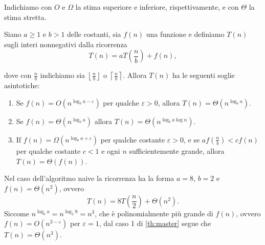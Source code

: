 Indichiamo con $ O $ e $ \Omega $ la stima superiore e inferiore, rispettivamente, e con $
\Theta $ la stima stretta.
\begin{theorem}
  \label{th:master}
  Siano $ a\ge 1 $ e $ b>1 $ delle costanti, sia $ f(n) $ una funzione e definiamo $ T(n) $ sugli
  interi nonnegativi dalla ricorrenza
  \begin{equation*}
    T(n) = aT(\frac{n}{b}) + f(n),
  \end{equation*}
\end{theorem}
dove con $ \frac{n}{b} $ indichiamo sia $ \left\lfloor \frac{n}{b} \right\rfloor $ o $ \left\lceil
\frac{n}{b} \right\rceil  $. Allora $ T(n) $ ha le seguenti soglie asintotiche:
\begin{enumerate}
  \item Se $ f(n) = O(n^{\log_b a-\varepsilon}) $ per qualche $ \varepsilon >0 $, allora $ T(n) =
    \Theta(n^{\log_b a}) $.
  \item Se $ f(n) = \Theta(n^{\log_b a}) $ allora $ T(n) = \Theta(n^{\log_b a \log n}) $.
  \item If $ f(n) = \Omega(n^{\log_b a + \varepsilon}) $ per qualche costante $ \varepsilon >0 $, e
    se $ af(\frac{n}{b}) < cf(n) $ per qualche costante $ c<1$ e ogni $ n $ sufficientemente grande,
    allora $ T(n) = \Theta(f(n)) $.
\end{enumerate}

\begin{example}
  Nel caso dell'algoritmo naive la ricorrenza ha la forma $ a = 8 $, $ b = 2 $ e $ f(n) =
  \Theta(n^2) $, ovvero
  \begin{equation*}
    T(n) = 8T(\frac{n}{2}) + \Theta(n^2).
  \end{equation*}
  Siccome $ n^{\log_b a} = n^{\log_2 8} = n^3 $, che è polinomialmente più grande di $ f(n) $, ovvero $
  f(n) = O(n^{3-\varepsilon}) $ per $ \varepsilon = 1 $, dal caso 1 di \ref{th:master} segue che $
  T(n) = \Theta(n^3) $.
\end{example}
